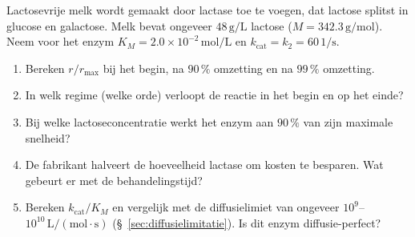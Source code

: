 \begin{oefening}
Lactosevrije melk wordt gemaakt door lactase toe te voegen, dat lactose splitst in glucose en galactose. Melk bevat ongeveer \(48\,\mathrm{g/L}\) lactose (\(M = 342.3\,\mathrm{g/mol}\)). Neem voor het enzym \(K_M = 2.0\times10^{-2}\,\mathrm{mol/L}\) en \(k_{\text{cat}} = k_2 = 60\,\mathrm{1/s}\).

\begin{enumerate}
\item[(a)]
  Bereken \(r/r_{\max}\) bij het begin, na \(90\,\%\) omzetting en na \(99\,\%\) omzetting.
\item[(b)]
  In welk regime (welke orde) verloopt de reactie in het begin en op het einde?
\item[(c)]
  Bij welke lactoseconcentratie werkt het enzym aan \(90\,\%\) van zijn maximale snelheid?
\item[(d)]
  De fabrikant halveert de hoeveelheid lactase om kosten te besparen. Wat gebeurt er met de behandelingstijd?
\item[(e)]
  Bereken \(k_{\text{cat}}/K_M\) en vergelijk met de diffusielimiet van ongeveer \(10^{9}\)--\(10^{10}\,\mathrm{L/(mol\cdot s)}\) (\S~\ref{sec:diffusielimitatie}). Is dit enzym diffusie-perfect?
\end{enumerate}
\end{oefening}
